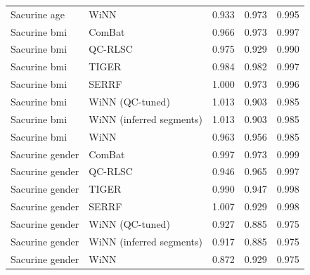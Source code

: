 \begin{longtable}{llrrr}
Sacurine age & WiNN & 0.933 & 0.973 & 0.995 \\
Sacurine bmi & ComBat & 0.966 & 0.973 & 0.997 \\
Sacurine bmi & QC-RLSC & 0.975 & 0.929 & 0.990 \\
Sacurine bmi & TIGER & 0.984 & 0.982 & 0.997 \\
Sacurine bmi & SERRF & 1.000 & 0.973 & 0.996 \\
Sacurine bmi & WiNN (QC-tuned) & 1.013 & 0.903 & 0.985 \\
Sacurine bmi & WiNN (inferred segments) & 1.013 & 0.903 & 0.985 \\
Sacurine bmi & WiNN & 0.963 & 0.956 & 0.985 \\
Sacurine gender & ComBat & 0.997 & 0.973 & 0.999 \\
Sacurine gender & QC-RLSC & 0.946 & 0.965 & 0.997 \\
Sacurine gender & TIGER & 0.990 & 0.947 & 0.998 \\
Sacurine gender & SERRF & 1.007 & 0.929 & 0.998 \\
Sacurine gender & WiNN (QC-tuned) & 0.927 & 0.885 & 0.975 \\
Sacurine gender & WiNN (inferred segments) & 0.917 & 0.885 & 0.975 \\
Sacurine gender & WiNN & 0.872 & 0.929 & 0.975 \\
\end{longtable}
